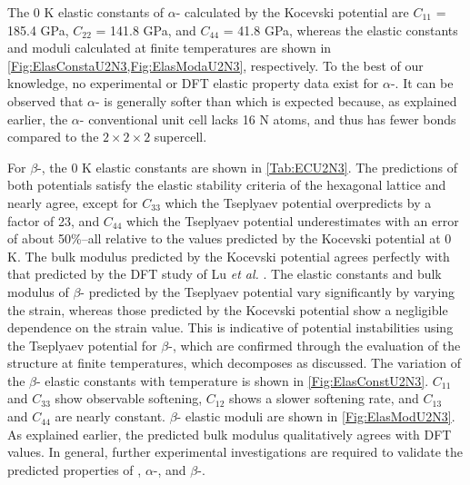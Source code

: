 \documentclass[preprint, 12pt]{elsarticle}
\providecommand{\DIFaddtex}[1]{{\protect\color{blue} \sf #1}} %
\providecommand{\DIFaddbegin}{} %
\providecommand{\DIFaddend}{} %
\providecommand{\DIFadd}[1]{\texorpdfstring{\DIFaddtex{#1}}{#1}} %
\newcommand{\DIFaddincludegraphics}[2][]{{\color{blue}\fbox{\DIFOincludegraphics[#1]{#2}}}} %
\DeclareRobustCommand{\DIFaddbegin}{\DIFOaddbegin \let\includegraphics\DIFaddincludegraphics} %
\DeclareRobustCommand{\DIFaddend}{\DIFOaddend \let\includegraphics\DIFOincludegraphics} %
\begin{document}
The 0 K elastic constants of $\alpha$- calculated by the Kocevski potential are $C_{11}$ = 185.4 GPa, $C_{22}$ = 141.8 GPa, and $C_{44}$ = 41.8 GPa, whereas the elastic constants and moduli calculated at finite temperatures are shown in \cref{Fig:ElasConstaU2N3,Fig:ElasModaU2N3}, respectively. To the best of our knowledge, no experimental or DFT elastic property data exist for $\alpha$-. It can be observed that $\alpha$- is generally softer than  which is expected because, as explained earlier, the $\alpha$- conventional unit cell lacks 16 N atoms, and thus has fewer bonds compared to the $2 \times 2 \times 2$  supercell.

For $\beta$-, the 0 K elastic constants are shown in \cref{Tab:ECU2N3}. The predictions of both potentials satisfy the \DIFaddbegin \DIFadd{elastic }\DIFaddend stability criteria of the hexagonal lattice and nearly agree, except for $C_{33}$ which the Tseplyaev potential overpredicts by a factor of 23, and $C_{44}$ which the Tseplyaev potential underestimates with an error of about 50\%--all relative to the values predicted by the Kocevski potential at 0 K. The bulk modulus predicted by the Kocevski potential agrees perfectly with that predicted by the DFT study of Lu \textit{et al.} \cite{Lu2011}. The elastic constants and bulk modulus of $\beta$- predicted by the Tseplyaev potential vary significantly by varying the strain, whereas those predicted by the Kocevski potential show a negligible dependence on the strain value. This is indicative of potential instabilities using the Tseplyaev potential for $\beta$-, which are confirmed through the evaluation of the structure at finite temperatures, which decomposes as discussed. The variation of the $\beta$- elastic constants with temperature is shown in \cref{Fig:ElasConstU2N3}. $C_{11}$ and $C_{33}$ show observable softening, $C_{12}$ shows a slower softening rate, and $C_{13}$ and $C_{44}$ are nearly constant. $\beta$- elastic moduli are shown in \cref{Fig:ElasModU2N3}. As explained earlier, the predicted bulk modulus qualitatively agrees with DFT values. In general, further experimental investigations are required to validate the predicted properties of , $\alpha$-, and $\beta$-.
\end{document}
